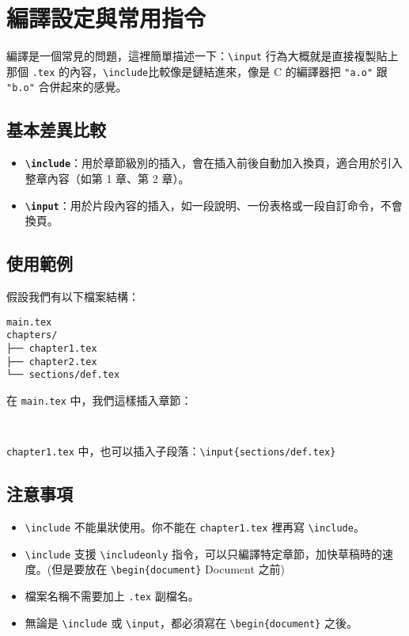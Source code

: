 \chapter{編譯設定與常用指令}
\label{chap1}

編譯是一個常見的問題，這裡簡單描述一下：\texttt{\textbackslash input} 行為大概就是直接複製貼上那個 \texttt{.tex} 的內容，\texttt{\textbackslash include}比較像是鏈結進來，像是 C 的編譯器把 \texttt{"a.o"} 跟 \texttt{"b.o"} 合併起來的感覺。

\section{基本差異比較}

\begin{itemize}
  \item \textbf{\texttt{\textbackslash include}}：用於章節級別的插入，會在插入前後自動加入換頁，適合用於引入整章內容（如第 1 章、第 2 章）。
  \item \textbf{\texttt{\textbackslash input}}：用於片段內容的插入，如一段說明、一份表格或一段自訂命令，不會換頁。
\end{itemize}

\section{使用範例}

假設我們有以下檔案結構：

\begin{verbatim}
main.tex
chapters/
├── chapter1.tex
├── chapter2.tex
└── sections/def.tex
\end{verbatim}

在 \texttt{main.tex} 中，我們這樣插入章節：

\begin{verbatim}


\end{verbatim}

\texttt{chapter1.tex} 中，也可以插入子段落：\texttt{\textbackslash input\{sections/def.tex\}}

\section{注意事項}

\begin{itemize}
  \item \texttt{\textbackslash include} 不能巢狀使用。你不能在 \texttt{chapter1.tex} 裡再寫 \texttt{\textbackslash include}。
  \item \texttt{\textbackslash include} 支援 \texttt{\textbackslash includeonly} 指令，可以只編譯特定章節，加快草稿時的速度。(但是要放在 \texttt{\textbackslash begin\{document\}} Document 之前)
  \item 檔案名稱不需要加上 \texttt{.tex} 副檔名。
  \item 無論是 \texttt{\textbackslash include} 或 \texttt{\textbackslash input}，都必須寫在 \texttt{\textbackslash begin\{document\}} 之後。
\end{itemize}

